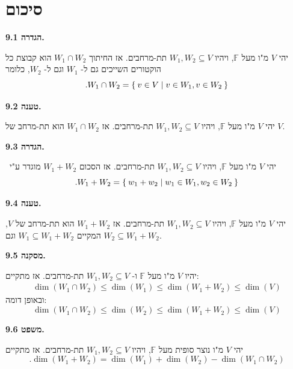 \documentclass[12pt]{report}
\theoremstyle{plain}
\theoremstyle{definition}
\newcommand{\F}{\mathbb{F}}
\newcommand{\0}{\mathbf{0}}
\begin{document}
\clearpage
\section{סיכום}

\noindent\textbf{הגדרה 9.1.}

יהי 
$V$
מ"ו מעל
$\F$,
ויהיו 
$W_1,W_2\subseteq V$
תת-מרחבים. אז החיתוך
$W_1\cap W_2$
הוא קבוצת כל הוקטורים השייכים גם ל-
$W_1$
וגם ל-
$W_2$,
כלומר
$$
.W_1\cap W_2=\Set{v\in V|v\in W_1,v\in W_2}
$$
\bigskip
\bigskip

\noindent\textbf{טענה 9.2.}

יהי 
$V$
מ"ו מעל
$\F$,
ויהיו 
$W_1,W_2\subseteq V$
תת-מרחבים. אז 
$W_1\cap W_2$
הוא תת-מרחב של
$V$.
\bigskip
\bigskip

\noindent\textbf{הגדרה 9.3.}

\
יהי 
$V$
מ"ו מעל
$\F$,
ויהיו 
$W_1,W_2\subseteq V$
תת-מרחבים. אז הסכום
$W_1+W_2$
מוגדר ע"י
$$
.W_1+W_2=\Set{w_1+w_2|w_1\in W_1,w_2\in W_2}
$$
\bigskip
\bigskip

\noindent\textbf{טענה 9.4.}

יהי 
$V$
מ"ו מעל
$\F$,
ויהיו 
$W_1,W_2\subseteq V$
תת-מרחבים. אז 
$W_1+W_2$
הוא תת-מרחב של
$V$,
המקיים
$W_1\subseteq W_1+W_2$
וגם
$W_2\subseteq W_1+W_2$.
\bigskip
\bigskip

\noindent\textbf{מסקנה 9.5.}

יהיו
$V$
מ"ו מעל
$\F$
ו-
$W_1,W_2\subseteq V$
תת-מרחבים.
אז מתקיים:
$$
\begin{aligned}
\dim(W_1\cap W_2)\leq \dim(W_1)\leq\dim(W_1+W_2)\leq\dim(V)
\end{aligned}
$$
ובאופן דומה:
$$
\dim(W_1\cap W_2)\leq \dim(W_2)\leq\dim(W_1+W_2)\leq\dim(V)
$$
\bigskip
\bigskip

\noindent\textbf{משפט 9.6.}

יהי 
$V$
מ"ו נוצר סופית מעל
$\F$,
ויהיו
$W_1,W_2\subseteq V$
תת-מרחבים. אז מתקיים
$$
.\dim(W_1+W_2)=\dim(W_1)+\dim(W_2)-\dim(W_1\cap W_2)
$$
\bigskip
\bigskip
\end{document}
